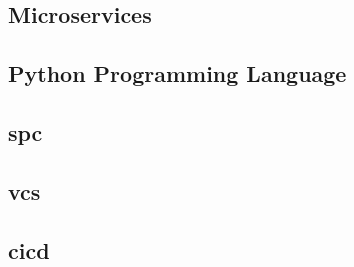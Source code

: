 \subsection{Microservices}

\subsection{Python Programming Language}

\subsection{\acf{spc}}

\subsection{\acf{vcs}}

\subsection{\acf{cicd}}